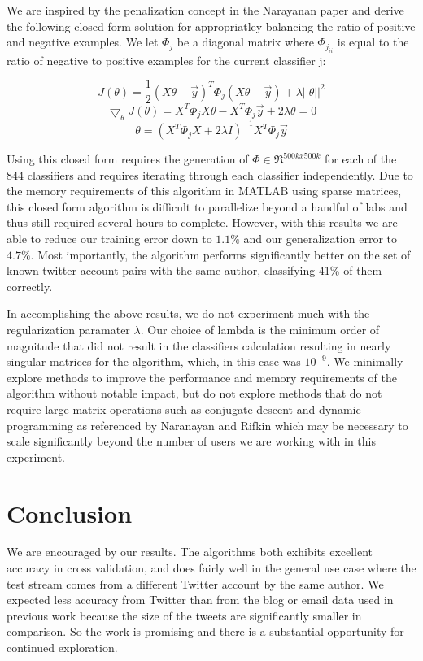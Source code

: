\documentclass[10pt, conference, compsocconf]{IEEEtran}
\begin{document}
We are inspired by the penalization concept in the Narayanan paper and derive the following closed form solution for appropriatley balancing the ratio of positive and negative examples. We let $\Phi_j$ be a diagonal matrix where $\Phi_{j_{ii}}$ is equal to the ratio of negative to positive examples for the current classifier j:

$$J(\theta) = \frac{1}{2} (X\theta - \vec{y})^T \Phi_j (X\theta-\vec{y}) + \lambda ||\theta||^2 $$
$$ \bigtriangledown_\theta J(\theta) = X^T \Phi_j X \theta -X^T \Phi_j \vec{y} +2 \lambda \theta = 0$$
$$ \theta= (X^T\Phi_j X+2 \lambda I)^{-1} X^T \Phi_j \vec{y}$$

Using this closed form requires the generation of $\Phi \in \Re^{500k x 500k}$   for each of the 844 classifiers and requires  iterating through each classifier independently.  Due to the memory requirements of this algorithm in MATLAB using sparse matrices, this closed form algorithm is difficult to parallelize beyond a handful of labs and thus still required several hours to complete.  However, with this results we are able to reduce our training error down to $1.1\%$ and our generalization error to $4.7\%$.  Most importantly,  the algorithm performs significantly better on the set of known twitter account pairs with the same author, classifying 41\% of them correctly.  

In accomplishing the above results, we do not experiment much with the regularization paramater $\lambda$.  Our choice of lambda is the minimum order of magnitude that did not result in the classifiers calculation resulting in nearly singular matrices for the algorithm, which, in this case was $10^{-9}$.  We minimally explore methods to improve the performance and memory requirements of the algorithm without notable impact, but do not explore methods that do not require large matrix operations such as conjugate descent and dynamic programming as referenced by Naranayan and Rifkin \cite{Rifkin} which may be necessary to scale significantly beyond the number of users we are working with in this experiment. 

\section{Conclusion}

We are encouraged by our results. The algorithms both exhibits
excellent accuracy in cross validation, and  does fairly well in
the general use case where the test stream comes from a different
Twitter account by the same author. We expected less accuracy from
Twitter than from the blog or email data used in previous work because
the size of the tweets are significantly smaller in comparison. So the work is promising and
there is a substantial opportunity for continued exploration.
\end{document}
